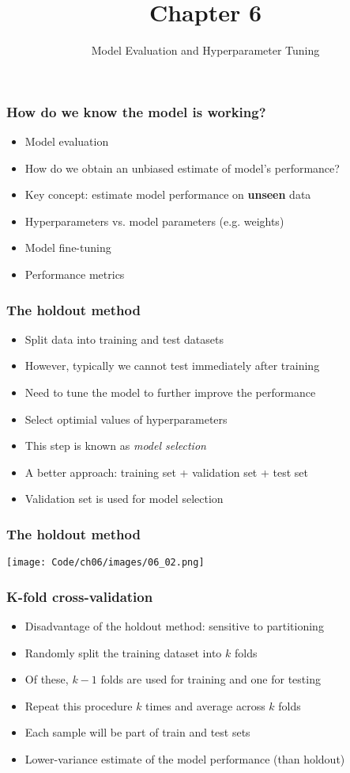 \documentclass{beamer}
\title{Chapter 6}
\subtitle{Model Evaluation and Hyperparameter Tuning}
\begin{document}
\maketitle

\begin{frame}
  \frametitle{How do we know the model is working?}
  \begin{itemize}
  \item Model evaluation
  \item How do we obtain an unbiased estimate of model's performance?
  \item Key concept: estimate model performance on \textbf{unseen} data
  \item Hyperparameters vs. model parameters (e.g. weights)
  \item Model fine-tuning
  \item Performance metrics
  \end{itemize}
\end{frame}

\begin{frame}
  \frametitle{The holdout method}
  \begin{itemize}
  \item Split data into training and test datasets
  \item However, typically we cannot test immediately after training
  \item Need to tune the model to further improve the performance
  \item Select optimial values of hyperparameters
  \item This step is known as \textit{model selection}
  \item A better approach: training set + validation set + test set
  \item Validation set is used for model selection
  \end{itemize}
\end{frame}

\begin{frame}
  \frametitle{The holdout method}
  \texttt{[image: Code/ch06/images/06\_02.png]}
\end{frame}

\begin{frame}
  \frametitle{K-fold cross-validation}
  \begin{itemize}
  \item Disadvantage of the holdout method: sensitive to partitioning
  \item Randomly split the training dataset into $k$ folds
  \item Of these, $k-1$ folds are used for training and one for testing
  \item Repeat this procedure $k$ times and average across $k$ folds
  \item Each sample will be part of train and test sets
  \item Lower-variance estimate of the model performance (than holdout)
  \end{itemize}
\end{frame}
\end{document}

